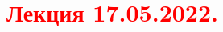 \documentclass[main.tex]{subfiles}
\begin{document}
\section{\textcolor{red}{Лекция 17.05.2022.}}
\end{document}
